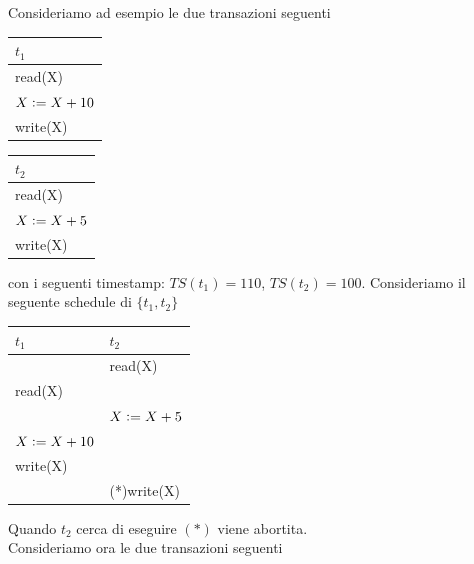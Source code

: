 \noindent Consideriamo ad esempio le due transazioni seguenti
\begin{multicols}{2}
 \begin{tabular}{|l|}
  \hline
  $t_1$\\
  \hline
  read(X)\\
  $X\vcentcolon=X+10$\\
  write(X)\\
  \hline
 \end{tabular}

  \begin{tabular}{|l|}
  \hline
  $t_2$\\
  \hline
  read(X)\\
  $X\vcentcolon=X+5$\\
  write(X)\\
  \hline
 \end{tabular} 
\end{multicols}

con i seguenti timestamp: $TS(t_1)= 110$, $TS(t_2)=100$. Consideriamo il seguente schedule di $\{t_1, t_2\}$
\begin{center}
 \begin{tabular}{|l|l|}
 \hline
  $t_1$ & $t_2$\\
 \hline
 &read(X)\\
 read(X)&\\
 &$X\vcentcolon=X+5$\\
 $X\vcentcolon =X+10$&\\
  write(X)&\\
  &(*)write(X)\\
  \hline
 \end{tabular}
\end{center}

Quando $t_2$ cerca di eseguire $(*)$ viene abortita.\\

\noindent Consideriamo ora le due transazioni seguenti

